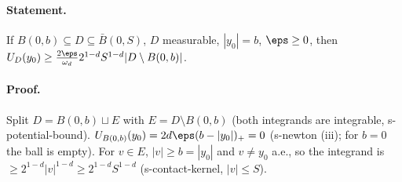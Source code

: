 \paragraph{Statement.} If $B(0,b)\subseteq D\subseteq\bar B(0,S)$, $D$ measurable, $|y_0|=b$, $\eps\geq0$, then
$U_D(y_0)\geq\frac{2\eps}{\omega_d}2^{1-d}S^{1-d}|D\setminus B(0,b)|$.
\paragraph{Proof.} Split $D=B(0,b)\sqcup E$ with $E=D\setminus B(0,b)$ (both integrands are integrable, s-potential-bound). $U_{B(0,b)}(y_0)=2d\eps(b-|y_0|)_+=0$
(s-newton (iii); for $b=0$ the ball is empty). For $v\in E$, $|v|\geq b=|y_0|$ and $v\neq y_0$ a.e., so the integrand is
$\geq2^{1-d}|v|^{1-d}\geq2^{1-d}S^{1-d}$ (s-contact-kernel, $|v|\leq S$).
